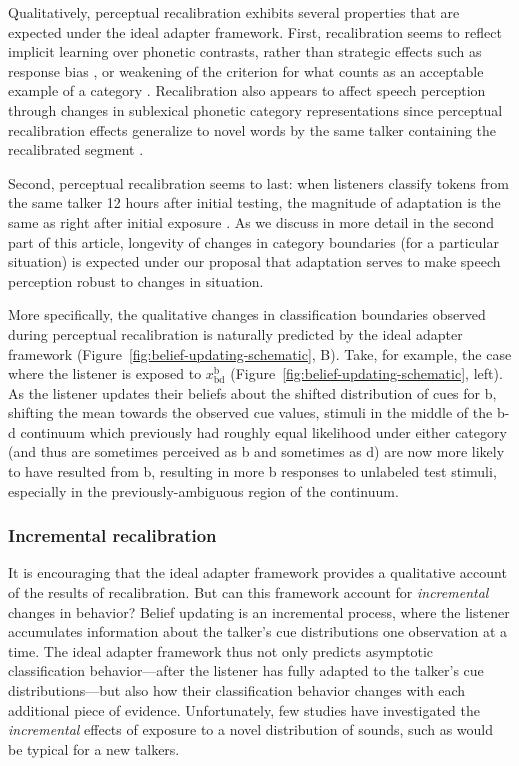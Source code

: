 Qualitatively, perceptual recalibration exhibits several properties that are expected under the ideal adapter framework. First, recalibration seems to reflect implicit learning over phonetic contrasts, rather than strategic effects such as response bias \autocite{Clarke-Davidson2008}, or weakening of the criterion for what counts as an acceptable example of a category \autocite[][but see next section]{Maye2008a}.
Recalibration also appears to affect speech perception through changes in sublexical phonetic category representations since perceptual recalibration effects generalize to novel words by the same talker containing the recalibrated segment \autocite{McQueen2006}.

Second, perceptual recalibration seems to last: when listeners classify tokens from the same talker 12 hours after initial testing, the magnitude of adaptation is the same as right after initial exposure \autocite{Eisner2006}. As we discuss in more detail in the second part of this article, longevity of changes in category boundaries (for a particular situation) is expected under our proposal that adaptation serves to make speech perception robust to changes in situation.

More specifically, the qualitative changes in classification boundaries observed during perceptual recalibration is naturally predicted by the ideal adapter framework (Figure~\ref{fig:belief-updating-schematic}, B).  Take, for example, the case where the listener is exposed to $x_\mathrm{bd}^\mathrm{b}$ (Figure~\ref{fig:belief-updating-schematic}, left).  As the listener updates their beliefs about the shifted distribution of cues for \ph b, shifting the mean towards the observed cue values, stimuli in the middle of the \ph b-\ph d continuum which previously had roughly equal likelihood under either category (and thus are sometimes perceived as \ph b and sometimes as \ph d) are now more likely to have resulted from \ph b, resulting in more \ph b responses to unlabeled test stimuli, especially in the previously-ambiguous region of the continuum.

\subsubsection{Incremental recalibration}
\label{sec:incr-recal}

It is encouraging that the ideal adapter framework provides a qualitative account of the results of recalibration.  But can this framework account for \emph{incremental} changes in behavior?  Belief updating is an incremental process, where the listener accumulates information about the talker's cue distributions one observation at a time.  The ideal adapter framework thus not only predicts asymptotic classification behavior---after the listener has fully adapted to the talker's cue distributions---but also how their classification behavior changes with each additional piece of evidence.
Unfortunately, few studies have investigated the \emph{incremental} effects of exposure to a novel distribution of sounds, such as would be typical for a new talkers.

